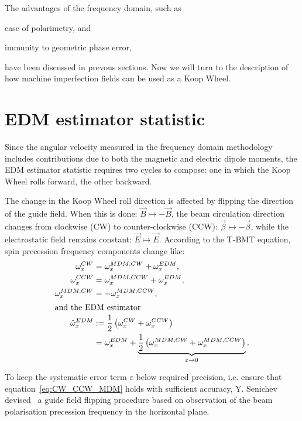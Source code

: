 \documentclass[]{elsarticle}
\newcommand{\w}{\omega}
\begin{document}
The advantages of the frequency domain, such as
\begin{enumerate*}%
\item ease of polarimetry, and
\item immunity to geometric phase error,
\end{enumerate*}
have been discussed in prevous sections. Now we will turn to the description of how machine imperfection fields
can be used as a Koop Wheel.

\section{EDM estimator statistic}
Since the angular velocity measured in the frequency domain methodology includes contributions due to both the
magnetic and electric dipole moments, the EDM estimator statistic requires two cycles to compose:
one in which the Koop Wheel rolls forward, the other backward.

The change in the Koop Wheel roll direction is affected by flipping the direction of the guide field.
When this is done:
$\vec B \mapsto -\vec B$, the beam circulation direction changes from clockwise (CW) to counter-clockwise (CCW): 
$\vec\beta \mapsto -\vec\beta$, while the electrostatic field remains constant: $\vec E \mapsto \vec E$.
According to the T-BMT equation, spin precession frequency components change like:
\begin{subequations}
  \begin{align}
    \w_x^{CW} &= \w_x^{MDM, CW}   + \w_x^{EDM}, \notag\\
    \w_x^{CCW} &= \w_x^{MDM, CCW} + \w_x^{EDM}, \notag\\
    \w_x^{MDM, CW} &= -\w_x^{MDM, CCW}, \label{eq:CW_CCW_MDM}\\
    \intertext{and the EDM estimator}
    \hat\w_x^{EDM} &:= \frac12\bkt{\w_x^{CW} + \w_x^{CCW}} \label{eq:FDM_estimator} \\
              &=  \w_x^{EDM} +
                \underbrace{\frac12\bkt{\w_x^{MDM, CW} + \w_x^{MDM, CCW}}}_{\varepsilon \to 0}.
  \end{align}
\end{subequations}

To keep the systematic error term $\varepsilon$ below required precision, i.e. ensure
that equation~\eqref{eq:CW_CCW_MDM} holds with sufficient accuracy, Y. Senichev 
devised~\cite{Senichev:FDM} a guide field flipping procedure
based on observation of the beam polarisation precession frequency in the horizontal plane.
\end{document}
